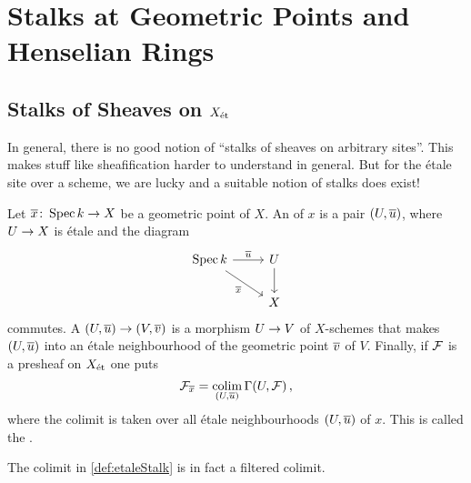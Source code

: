 \section{Stalks at Geometric Points and Henselian Rings}\label{sec:Stalks}
\subsection{Stalks of Sheaves on \texorpdfstring{$X_{\mathrm{\acute{e}t}}$}{Xet}}
In general, there is no good notion of \enquote{stalks of sheaves on arbitrary sites}. This makes stuff like sheafification harder to understand in general. But for the étale site over a scheme, we are lucky and a suitable notion of stalks does exist!

\begin{defi}\label{def:etaleStalk}
	Let $\ov{x}\colon \Spec k\morphism X$ be a geometric point of $X$. An  of $x$ is a pair $(U,\ov{u})$, where $U\morphism X$ is étale and the diagram
	\begin{equation*}
		\begin{tikzcd}
			\Spec k\rar["\ov{u}"]\drar["\ov{x}"{swap}]& U\dar\\
			 & X\end{tikzcd}
	\end{equation*}
	commutes. A  $(U,\ov{u})\morphism(V,\ov{v})$ is a morphism $U\morphism V$ of $X$-schemes that makes $(U,\ov{u})$ into an étale neighbourhood of the geometric point $\ov{v}$ of $V$. Finally, if $\mathcal{F}$ is a presheaf on $X_{\mathrm{\acute{e}t}}$ one puts
	\begin{equation*}
		\Ff_{\ov{x}}= \colimit_{(U,\ov{u})}\Global(U,\Ff)\,,
	\end{equation*}
	where the colimit is taken over all étale neighbourhoods $(U,\ov{u})$ of $x$. This is called the .
\end{defi}
\begin{fact}\label{fact:filtered}
	The colimit in \cref{def:etaleStalk} is in fact a filtered colimit.
\end{fact}
